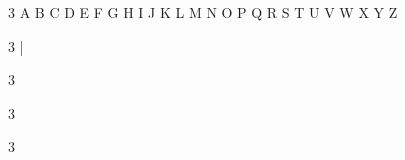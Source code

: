 \documentclass[12pt,twoside]{article}
\begin{document}

\begin{multicols}{3}
\charexample A
\charexample B
\charexample C
\charexample D
\charexample E
\charexample F
\charexample G
\charexample H
\charexample I
\charexample J
\charexample K
\charexample L
\charexample M
\charexample N
\charexample O
\charexample P
\charexample Q
\charexample R
\charexample S
\charexample T
\charexample U
\charexample V
\charexample W
\charexample X
\charexample Y
\charexample Z
\end{multicols}


\begin{multicols}{3}
  \def\hook{\footnote{You will run into trouble if you load \textsf{amsmath} after calling \vrb\mathfont\ with the \texttt{accent} keyword. This is a known bug.}}
\accentexample\acute
  \let\hook\relax
\accentexample\aacute
\accentexample\dot
\accentexample\ddot
\accentexample\grave
\accentexample\breve
\accentexample\hat
\accentexample\check
\accentexample\bar
\accentexample\mathring
\accentexample\tilde
\end{multicols}


\begin{multicols}{3}
\end{multicols}


\begin{multicols}{3}
\charexample\Alpha
\charexample\Beta
\charexample\Gamma
\charexample\Delta
\charexample\Epsilon
\charexample\Zeta
\charexample\Eta
\charexample\Theta
\charexample\Iota
\charexample\Kappa
\charexample\Lambda
\charexample\Mu
\charexample\Nu
\charexample\Xi
\charexample\Omicron
\charexample\Pi
\charexample\Rho
\charexample\Sigma
\charexample\Tau
\charexample\Upsilon
\charexample\Phi
\charexample\Chi
\charexample\Psi
\charexample\Omega
\charexample\varTheta
\charexample\increment
\charexample\nabla
\end{multicols}


\begin{multicols}{3}
\charexample\alpha
\charexample\beta
\charexample\gamma
\charexample\delta
\charexample\epsilon
\charexample\zeta
\charexample\eta
\charexample\theta
\charexample\iota
\charexample\kappa
\charexample\lambda
\charexample\mu
\charexample\nu
\charexample\xi
\charexample\omicron
\charexample\pi
\charexample\rho
\charexample\sigma
\charexample\tau
\charexample\upsilon
\charexample\phi
\charexample\chi
\charexample\psi
\charexample\omega
\charexample\varbeta
\charexample\varepsilon
\charexample\varkappa
\charexample\vartheta
\charexample\varrho
\charexample\varsigma
\charexample\varphi
\end{multicols}
\end{document}
